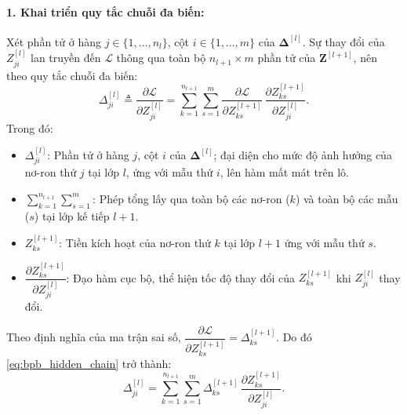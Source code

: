 \paragraph{1. Khai triển quy tắc chuỗi đa biến:}
Xét phần tử ở hàng $j \in \{1,\dots,n_l\}$, cột $i \in \{1,\dots,m\}$ của $\boldsymbol{\Delta}^{[l]}$. Sự thay đổi của $Z_{ji}^{[l]}$ lan truyền đến $\mathcal{L}$ thông qua toàn bộ $n_{l+1} \times m$ phần tử của $\mathbf{Z}^{[l+1]}$, nên theo quy tắc chuỗi đa biến:
\begin{equation}
\Delta_{ji}^{[l]} \triangleq \frac{\partial\mathcal{L}}{\partial Z_{ji}^{[l]}} = \sum_{k=1}^{n_{l+1}}\sum_{s=1}^{m} \frac{\partial\mathcal{L}}{\partial Z_{ks}^{[l+1]}}\,\frac{\partial Z_{ks}^{[l+1]}}{\partial Z_{ji}^{[l]}}.
\label{eq:bpb_hidden_chain}
\end{equation}
Trong đó:
\begin{itemize}
    \item $\Delta_{ji}^{[l]}$: Phần tử ở hàng $j$, cột $i$ của $\boldsymbol{\Delta}^{[l]}$; đại diện cho mức độ ảnh hưởng của nơ-ron thứ $j$ tại lớp $l$, ứng với mẫu thứ $i$, lên hàm mất mát trên lô.
    \item $\sum_{k=1}^{n_{l+1}}\sum_{s=1}^{m}$: Phép tổng lấy qua toàn bộ các nơ-ron ($k$) và toàn bộ các mẫu ($s$) tại lớp kế tiếp $l+1$.
    \item $Z_{ks}^{[l+1]}$: Tiền kích hoạt của nơ-ron thứ $k$ tại lớp $l+1$ ứng với mẫu thứ $s$.
    \item $\dfrac{\partial Z_{ks}^{[l+1]}}{\partial Z_{ji}^{[l]}}$: Đạo hàm cục bộ, thể hiện tốc độ thay đổi của $Z_{ks}^{[l+1]}$ khi $Z_{ji}^{[l]}$ thay đổi.
\end{itemize}
Theo định nghĩa của ma trận sai số, $\dfrac{\partial\mathcal{L}}{\partial Z_{ks}^{[l+1]}} = \Delta_{ks}^{[l+1]}$. Do đó \eqref{eq:bpb_hidden_chain} trở thành:
\begin{equation}
\Delta_{ji}^{[l]} = \sum_{k=1}^{n_{l+1}}\sum_{s=1}^{m} \Delta_{ks}^{[l+1]}\,\frac{\partial Z_{ks}^{[l+1]}}{\partial Z_{ji}^{[l]}}.
\label{eq:bpb_hidden_sub}
\end{equation}
 
